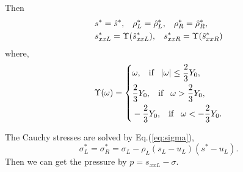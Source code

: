 \documentclass{article}
\theoremstyle{plain}\newtheorem{definition}{\sc{Definition}}
\theoremstyle{defination}\newtheorem{example}{Example}[section]
\numberwithin{equation}{section}
\numberwithin{table}{section}
\begin{document}
Then 
\begin{align}
&  s^* = \hat{s}^*,\hspace{0.3cm} \rho^*_L = \hat{\rho}_L^*, \hspace{0.3cm} \rho_R^* = \hat{\rho}_R^*,\\
&  s_{xxL}^*  = \Upsilon(\hat{s}_{xxL}^*),\hspace{0.3cm} s_{xxR}^*  = \Upsilon(\hat{s}_{xxR}^*)
\end{align}
where,
\begin{equation}\label{eq:upsilon}
  \Upsilon(\omega) = \left\{ \begin{aligned}
	  &\omega, \hspace{0.3cm} \text{if} \hspace{0.3cm} |\omega| \le \frac{2}{3}Y_0,\\
	  &\frac{2}{3}Y_0,  \hspace{0.3cm} \text{if} \hspace{0.3cm} \omega > \frac{2}{3}Y_0,\\
	 &-\frac{2}{3}Y_0,  \hspace{0.3cm} \text{if} \hspace{0.3cm} \omega < -\frac{2}{3}Y_0.\\
 \end{aligned}\right.
 \end{equation}

 The Cauchy stresses are solved  by Eq.(\ref{eq:sigma}), 
\begin{equation*}
  \sigma_L^*=\sigma_R^*=\sigma_L -\rho_L (s_L-u_L)(s^*-u_L).
\end{equation*}
 Then we can get the pressure by $p =s_{xxL}-\sigma$.
\end{document}
